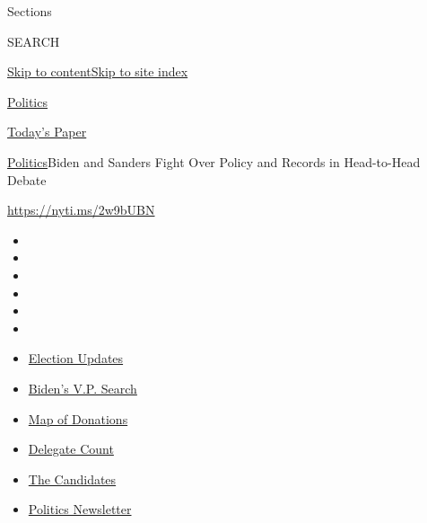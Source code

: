 Sections

SEARCH

\protect\hyperlink{site-content}{Skip to
content}\protect\hyperlink{site-index}{Skip to site index}

\href{https://www.nytimes.com/section/politics}{Politics}

\href{https://myaccount.nytimes.com/auth/login?response_type=cookie\&client_id=vi}{}

\href{https://www.nytimes.com/section/todayspaper}{Today's Paper}

\href{/section/politics}{Politics}\textbar{}Biden and Sanders Fight Over
Policy and Records in Head-to-Head Debate

\url{https://nyti.ms/2w9bUBN}

\begin{itemize}
\item
\item
\item
\item
\item
\item
\end{itemize}

\begin{itemize}
\item
  \href{https://www.nytimes.com/2020/07/31/us/elections/biden-vs-trump.html?action=click\&pgtype=Article\&state=default\&region=TOP_BANNER\&context=storylines_menu}{Election
  Updates}
\item
  \href{https://www.nytimes.com/article/biden-vice-president-2020.html?action=click\&pgtype=Article\&state=default\&region=TOP_BANNER\&context=storylines_menu}{Biden's
  V.P. Search}
\item
  \href{https://www.nytimes.com/interactive/2020/07/24/us/politics/trump-biden-campaign-donors.html?action=click\&pgtype=Article\&state=default\&region=TOP_BANNER\&context=storylines_menu}{Map
  of Donations}
\item
  \href{https://www.nytimes.com/interactive/2020/us/elections/delegate-count-primary-results.html?action=click\&pgtype=Article\&state=default\&region=TOP_BANNER\&context=storylines_menu}{Delegate
  Count}
\item
  \href{https://www.nytimes.com/interactive/2019/us/politics/2020-presidential-candidates.html?action=click\&pgtype=Article\&state=default\&region=TOP_BANNER\&context=storylines_menu}{The
  Candidates}
\item
  \href{https://www.nytimes.com/newsletters/politics?action=click\&pgtype=Article\&state=default\&region=TOP_BANNER\&context=storylines_menu}{Politics
  Newsletter}
\end{itemize}

